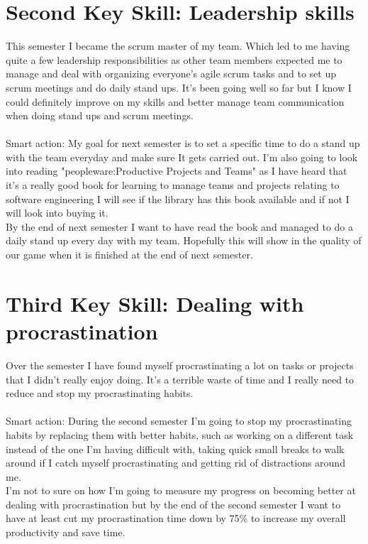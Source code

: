 \documentclass{scrartcl}
\begin{document}

\section{Second Key Skill: Leadership skills}
This semester I became the scrum master of my team. Which led to me having quite a few leadership responsibilities as other team members expected me to manage and deal with organizing everyone's agile scrum tasks and to set up scrum meetings and do daily stand ups. It's been going well so far but I know I could definitely improve on my skills and better manage team communication when doing stand ups and scrum meetings.
\\
\\
Smart action: My goal for next semester is to set a specific time to do a stand up with the team everyday and make sure It gets carried out. I'm also going to look into reading "peopleware:Productive Projects and Teams" as I have heard that it's a really good book for learning to manage teams and projects relating to software engineering
I will see if the library has this book available and if not I will look into buying it.
\\
By the end of next semester I want to have read the book and managed to do a daily stand up every day with my team. Hopefully this will show in the quality of our game when it is finished at the end of next semester.

\section{Third Key Skill: Dealing with procrastination}
Over the semester I have found myself procrastinating a lot on tasks or projects that I didn't really enjoy doing. It's a terrible waste of time and I really need to reduce and stop my procrastinating habits.
\\
\\
Smart action: During the second semester I'm going to stop my procrastinating habits by replacing them with better habits, such as working on a different task instead of the one I'm having difficult with, taking quick small breaks to walk around if I catch myself procrastinating and getting rid of distractions around me.
\\
I'm not to sure on how I'm going to measure my progress on becoming better at dealing with procrastination but by the end of the second semester I want to have at least cut my procrastination time down by 75\% to increase my overall productivity and save time.
\end{document}
